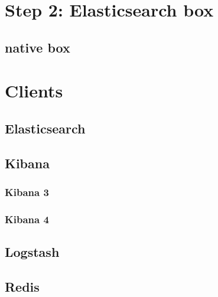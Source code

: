 \documentclass{article}
\begin{document}
\section{Step 2: Elasticsearch box}
\subsection{native box}




\section{Clients}
\subsection{Elasticsearch}
\subsection{Kibana}
\subsubsection{Kibana 3}

\subsubsection{Kibana 4}

\subsection{Logstash}

\subsection{Redis}
\end{document}
